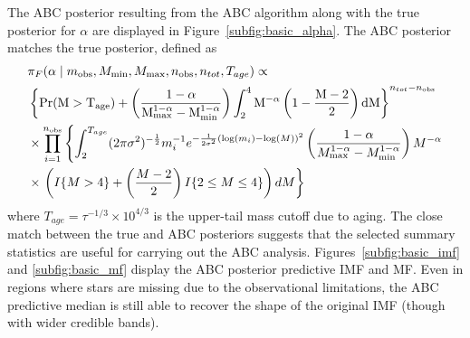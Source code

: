 \documentclass[ejs]{imsart}
\numberwithin{equation}{section}
\theoremstyle{plain}
\newcommand{\Proba}{\rm{Pr}}
\newcommand{\mobs}{m_{\text{obs}}}
\newcommand{\nobs}{n_{\text{obs}}}
\begin{document}
The ABC posterior resulting from the ABC algorithm along with the true posterior for $\alpha$ are displayed in Figure~\ref{subfig:basic_alpha}.  The ABC posterior matches the true posterior, defined as 
\begin{align}
&\pi_F(\alpha \mid  \mobs, M_{\min}, M_{\max}, \nobs, n_{tot}, T_{age}) \propto  \label{eq:simple_posterior}\\ 
&\left \{\Proba(M>T_{age})+\left(\frac{1-\alpha}{M_{\max}^{1-\alpha}-M_{\min}^{1-\alpha}}\right)\int_2^4 M^{-\alpha}\left(1-\frac{M-2}{2}\right )dM\right \}^{n_{tot}-\nobs}  \nonumber \\ \nonumber
& \times \prod_{i=1}^{\nobs}\left\{ \int_2^{T_{age}}(2\pi\sigma^2)^{-\frac{1}{2}}m_i^{-1}e^{-\frac{1}{2\sigma^2}(\log(m_i)-\log(M))^2} \left(\frac{1-\alpha}{M_{\max}^{1-\alpha}-M_{\min}^{1-\alpha}}\right)M^{-\alpha} \right.\\ \nonumber
& \times  \left.\left(I\{M>4\}+\left(\frac{M-2}{2}\right)I\{2\leq M\leq 4\}\right) dM \right\} 
\end{align}
where $T_{age} = \tau^{-1/3} \times 10^{4/3}$ is the upper-tail mass cutoff due to aging.  The close match between the true and ABC posteriors suggests that the selected summary statistics are useful for carrying out the ABC analysis.  Figures~\ref{subfig:basic_imf} and \ref{subfig:basic_mf} display the ABC posterior predictive IMF and MF.  Even in regions where stars are missing due to the observational limitations, the ABC predictive median is still able to recover the shape of the original IMF (though with wider credible bands).
\end{document}
